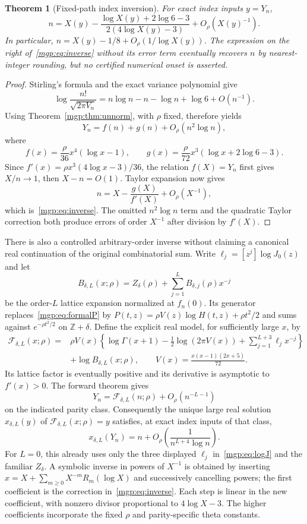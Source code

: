 \documentclass[11pt]{article}
\newtheorem{theorem}{Theorem}\newtheorem{lemma}[theorem]{Lemma}\newtheorem{corollary}[theorem]{Corollary}\newtheorem{remark}[theorem]{Remark}
\newcommand{\V}{V_n}\newcommand{\T}{T_{n,r}}\newcommand{\Z}{\mathbb Z}\newcommand{\E}{\mathbb E}\newcommand{\dd}{\,d}
\begin{document}
\begin{theorem}[Fixed-path index inversion]\label{mgp:thm:inverse}
For exact index inputs $y=Y_n$,
\begin{equation}\label{mgp:eq:inverse}
 n=X(y)-\frac{\log X(y)+2\log6-3}{2(4\log X(y)-3)}
       +O_\rho(X(y)^{-1}).
\end{equation}
In particular, $n=X(y)-1/8+O_\rho(1/\log X(y))$. The expression on the right of~\eqref{mgp:eq:inverse} without its error term eventually recovers $n$ by nearest-integer rounding, but no certified numerical onset is asserted.
\end{theorem}
\begin{proof}
Stirling's formula and the exact variance polynomial give
\[
 \log\frac{n!}{\sqrt{2\pi\V}}
 =n\log n-n-\log n+\log6+O(n^{-1}).
\]
Using Theorem~\ref{mgp:thm:unnorm}, with $\rho$ fixed, therefore yields
\[
 Y_n=f(n)+g(n)+O_\rho(n^2\log n),
\]
where
\[
 f(x)=\frac\rho{36}x^4(\log x-1),\qquad
 g(x)=\frac\rho{72}x^3(\log x+2\log6-3).
\]
Since $f'(x)=\rho x^3(4\log x-3)/36$, the relation $f(X)=Y_n$ first gives $X/n\to1$, then $X-n=O(1)$. Taylor expansion now gives
\[
 n=X-\frac{g(X)}{f'(X)}+O_\rho(X^{-1}),
\]
which is~\eqref{mgp:eq:inverse}. The omitted $n^2\log n$ term and the quadratic Taylor correction both produce errors of order $X^{-1}$ after division by $f'(X)$.
\end{proof}

There is also a controlled arbitrary-order inverse without claiming a canonical real continuation of the original combinatorial sum. Write $\ell_j=[z^j]\log J_0(z)$ and let
\[
 B_{\delta,L}(x;\rho)=Z_\delta(\rho)+\sum_{j=1}^{L}B_{\delta,j}(\rho)x^{-j}
\]
be the order-$L$ lattice expansion normalized at $f_n(0)$. Its generator replaces~\eqref{mgp:eq:formalP} by $P(t,z)=\rho V(z)\log H(t,z)+\rho t^2/2$ and sums against $e^{-\rho t^2/2}$ on $\mathbb Z+\delta$. Define the explicit real model, for sufficiently large $x$, by
\begin{align*}
 \mathcal F_{\delta,L}(x;\rho)
 ={}&\rho V(x)\left\{\log\Gamma(x+1)-\frac12\log(2\pi V(x))
                    +\sum_{j=1}^{L+3}\ell_jx^{-j}\right\}\\
 &+\log B_{\delta,L}(x;\rho),\qquad
 V(x)=\frac{x(x-1)(2x+5)}{72}.
\end{align*}
Its lattice factor is eventually positive and its derivative is asymptotic to $f'(x)>0$. The forward theorem gives
\[
 Y_n=\mathcal F_{\delta,L}(n;\rho)+O_\rho(n^{-L-1})
\]
on the indicated parity class. Consequently the unique large real solution $x_{\delta,L}(y)$ of $\mathcal F_{\delta,L}(x;\rho)=y$ satisfies, at exact index inputs of that class,
\[
 x_{\delta,L}(Y_n)=n+O_\rho\left(\frac1{n^{L+4}\log n}\right).
\]
For $L=0$, this already uses only the three displayed $\ell_j$ in~\eqref{mgp:eq:logJ} and the familiar $Z_\delta$. A symbolic inverse in powers of $X^{-1}$ is obtained by inserting
$x=X+\sum_{m\ge0}X^{-m}R_m(\log X)$ and successively cancelling powers; the first coefficient is the correction in~\eqref{mgp:eq:inverse}. Each step is linear in the new coefficient, with nonzero divisor proportional to $4\log X-3$. The higher coefficients incorporate the fixed $\rho$ and parity-specific theta constants.
\end{document}
